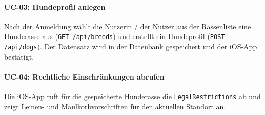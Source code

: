 \paragraph{UC-03: Hundeprofil anlegen}
Nach der Anmeldung wählt die Nutzerin / der Nutzer aus der Rassenliste eine Hunderasse aus
(\texttt{GET /api/breeds}) und erstellt ein Hundeprofil (\texttt{POST /api/dogs}). Der
Datensatz wird in der Datenbank gespeichert und der iOS-App bestätigt.

\paragraph{UC-04: Rechtliche Einschränkungen abrufen}
Die iOS-App ruft für die gespeicherte Hunderasse die \texttt{LegalRestrictions} ab und zeigt
Leinen- und Maulkorbvorschriften für den aktuellen Standort an.
